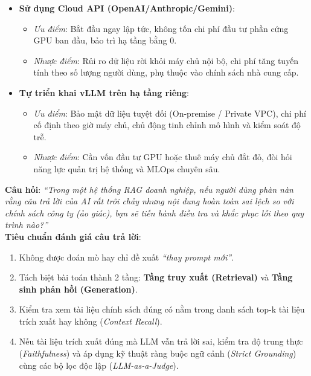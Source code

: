 \begin{tradeoffbox}
\begin{itemize}
  \item \textbf{Sử dụng Cloud API (OpenAI/Anthropic/Gemini)}:
    \begin{itemize}
      \item \textit{Ưu điểm}: Bắt đầu ngay lập tức, không tốn chi phí đầu tư phần cứng GPU ban đầu, bảo trì hạ tầng bằng 0.
      \item \textit{Nhược điểm}: Rủi ro dữ liệu rời khỏi máy chủ nội bộ, chi phí tăng tuyến tính theo số lượng người dùng, phụ thuộc vào chính sách nhà cung cấp.
    \end{itemize}
  \item \textbf{Tự triển khai vLLM trên hạ tầng riêng}:
    \begin{itemize}
      \item \textit{Ưu điểm}: Bảo mật dữ liệu tuyệt đối (On-premise / Private VPC), chi phí cố định theo giờ máy chủ, chủ động tinh chỉnh mô hình và kiểm soát độ trễ.
      \item \textit{Nhược điểm}: Cần vốn đầu tư GPU hoặc thuê máy chủ đắt đỏ, đòi hỏi năng lực quản trị hệ thống và MLOps chuyên sâu.
    \end{itemize}
\end{itemize}
\end{tradeoffbox}

\begin{interviewbox}
\textbf{Câu hỏi}: \textit{``Trong một hệ thống RAG doanh nghiệp, nếu người dùng phàn nàn rằng câu trả lời của AI rất trôi chảy nhưng nội dung hoàn toàn sai lệch so với chính sách công ty (ảo giác), bạn sẽ tiến hành điều tra và khắc phục lỗi theo quy trình nào?''}\\
\textbf{Tiêu chuẩn đánh giá câu trả lời}:
\begin{enumerate}
  \item Không được đoán mò hay chỉ đề xuất \textit{``thay prompt mới''}.
  \item Tách biệt bài toán thành 2 tầng: \textbf{Tầng truy xuất (Retrieval)} và \textbf{Tầng sinh phản hồi (Generation)}.
  \item Kiểm tra xem tài liệu chính sách đúng có nằm trong danh sách top-k tài liệu trích xuất hay không (\textit{Context Recall}).
  \item Nếu tài liệu trích xuất đúng mà LLM vẫn trả lời sai, kiểm tra độ trung thực (\textit{Faithfulness}) và áp dụng kỹ thuật ràng buộc ngữ cảnh (\textit{Strict Grounding}) cùng các bộ lọc độc lập (\textit{LLM-as-a-Judge}).
\end{enumerate}
\end{interviewbox}

